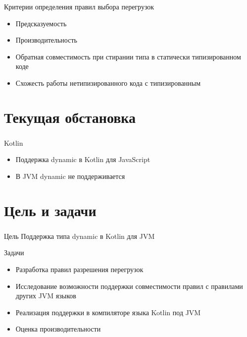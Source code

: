 \documentclass[t]{beamer}  %
\begin{document}
\begin{frame}[fragile]
	\frametitle{\insertsection} 
  	\framesubtitle{\insertsubsection}
    \begin{block}{Критерии определения правил выбора перегрузок}
    \begin{itemize}
		  \item Предсказуемость
          \item Производительность
          \item Обратная совместимость при стирании типа в статически типизированном коде
          \item Схожесть работы нетипизированного кода с типизированным
    \end{itemize}
    \end{block}
\end{frame}

\section{Текущая обстановка}
\begin{frame}
	\frametitle{\insertsection} 
    \begin{block}{Kotlin}
		\begin{itemize}
          \item Поддержка dynamic в Kotlin для JavaScript
          \item В JVM dynamic не поддерживается
		\end{itemize}
	\end{block}

\end{frame}


\section{Цель и задачи}
\begin{frame}
	\frametitle{\insertsection} 
    \begin{block}{Цель}
			Поддержка типа dynamic в Kotlin для JVM
	\end{block}
    \begin{block}{Задачи}
		\begin{itemize}
          \item Разработка правил разрешения перегрузок
          \item Исследование возможности поддержки совместимости правил с правилами других JVM языков
          \item Реализация поддержки в компиляторе языка Kotlin под JVM
          \item Оценка производительности
		\end{itemize}
	\end{block}

\end{frame}
\end{document}
